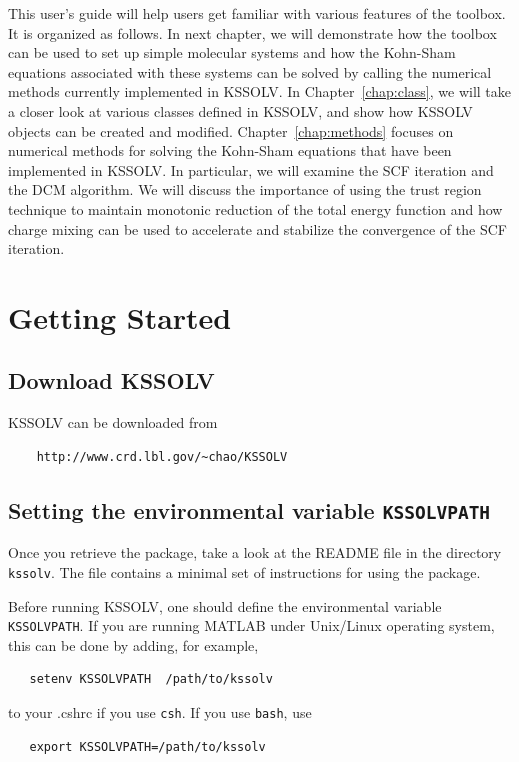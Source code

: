 \documentclass[11pt]{book}
\begin{document}
This user's guide will help users get familiar with various
features of the toolbox.  It is organized as follows. 
In next chapter, we will demonstrate how the toolbox
can be used to set up simple molecular systems and how the
Kohn-Sham equations associated with these systems can be solved
by calling the numerical methods currently implemented in KSSOLV.
In Chapter~\ref{chap:class}, we will take a closer look at
various classes defined in KSSOLV, and show how KSSOLV
objects can be created and modified.
Chapter~\ref{chap:methods} focuses on numerical methods for
solving the Kohn-Sham equations that have been  implemented 
in KSSOLV. In particular, we will examine the SCF iteration and
the DCM algorithm.  We will discuss the importance of using
the trust region technique to maintain monotonic reduction of the
total energy function and how charge mixing can be used to
accelerate and stabilize the convergence of the SCF iteration.

\chapter{Getting Started} \label{chap:start}
%
\section{Download KSSOLV}
KSSOLV can be downloaded from 
\begin{verbatim}
    http://www.crd.lbl.gov/~chao/KSSOLV
\end{verbatim}

\section{Setting the environmental variable {\tt KSSOLVPATH}}
Once you retrieve the package, take a look at the README file in the directory
{\tt kssolv}. The file contains a minimal set of instructions for 
using the package.

Before running KSSOLV, one should define the environmental variable {\tt
  KSSOLVPATH}.  If you are running MATLAB under Unix/Linux operating system, this can
  be done by adding, for example, 
\begin{verbatim}
   setenv KSSOLVPATH  /path/to/kssolv
\end{verbatim}
to your .cshrc if you use {\tt csh}.  If you use {\tt bash}, use
\begin{verbatim}
   export KSSOLVPATH=/path/to/kssolv
\end{verbatim}
\end{document}
